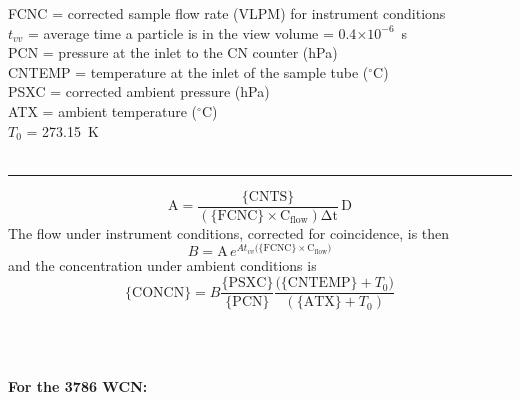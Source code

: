 \begin{hangparagraphs}
\begin{minipage}[t]{1\columnwidth}
{\begin{minipage}[t]{0.9\textwidth}
FCNC = corrected sample flow rate (VLPM) for instrument conditions\\
$t_{vv}$ = average time a particle is in the view volume = 0.4$\times10^{-6}$~s\\
PCN = pressure at the inlet to the CN counter (hPa)\\
CNTEMP = temperature at the inlet of the sample tube ($^{\circ}$C)\\
PSXC = corrected ambient pressure (hPa)\\
ATX = ambient temperature ($^{\circ}$C)\\
$T_{0}$ = 273.15~K\\
\\
\rule[0.5ex]{1\linewidth}{1pt}
\[
\mathrm{A=\frac{\{CNTS\}}{\mathrm{(\{FCNC\}\times C_{flow})}\Delta t}\,D}
\]
The flow under instrument conditions, corrected for coincidence, is
then\\
\[
B\mathrm{=A}\,e^{At_{vv}(\mathrm{\{FCNC\}\times C_{flow})}}
\]
and the concentration under ambient conditions is\\

\begin{equation}
\mathrm{\{CONCN\}}=B\frac{\mathrm{\{PSXC\}}}{\mathrm{\{PCN\}}}\frac{\mathrm{(\{CNTEMP\}}+T_{0})}{(\mathrm{\{ATX\}}+T_{0})}\label{eq:12.1}
\end{equation}
%
\end{minipage}} %
\end{minipage}\\
\\
\noindent\begin{minipage}[t]{1\columnwidth}%
\textbf{For the 3786 WCN:}\\
\end{minipage}
\end{hangparagraphs}
